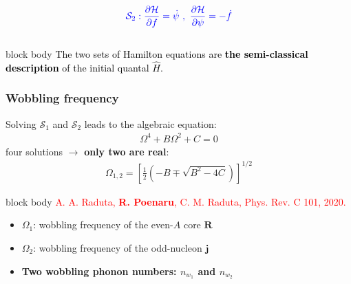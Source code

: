 \documentclass{beamer}
\begin{document}
\begin{frame}
\begin{columns}
\begin{column}{0.4\textwidth}
\begin{align}
				{\color{blue}\mathcal{S}_2: \frac{\partial \mathcal{H}}{\partial f}=\dot{\psi}\ ,\ \frac{\partial \mathcal{H}}{\partial \psi}=-\dot{f}}\nonumber
			\end{align}
		\end{column}
	\end{columns}
	\begin{beamercolorbox}[rounded=true,shadow=false, wd=\linewidth,]{block body}
		\centering
		\textcolor{black}{\small{The two sets of Hamilton equations are \textbf{the semi-classical description} of the initial quantal $\hat{H}$.}}
	\end{beamercolorbox}
\end{frame}


\begin{frame}
	\frametitle{Wobbling frequency}
	Solving {\color{red}$\mathcal{S}_1$} and {\color{blue}$\mathcal{S}_2$} leads to the algebraic equation:
	\begin{align}
		\Omega^4+B\Omega^2+C=0\nonumber
	\end{align}
	four solutions $\longrightarrow$ \textbf{only two are real}:
	\begin{align}
		\Omega_{1,2}=\left[\frac{1}{2}\left(-B\mp\sqrt{B^2-4C}\right)\right]^{1/2}\nonumber
	\end{align}
	\vspace{-0.3cm}
	\begin{beamercolorbox}[rounded=true,shadow=false, wd=\linewidth,]{block body}
		\centering
		\textcolor{red}{\footnotesize{A. A. Raduta, \textbf{R. Poenaru}, C. M. Raduta, Phys. Rev. C 101, 2020.}}
	\end{beamercolorbox}
	\vspace{-0.3cm}
	\begin{itemize}
		\item {\color{red}$\Omega_1$}: wobbling frequency of the {\color{red}even-$A$ core $\mathbf{R}$}
		\item {\color{blue}$\Omega_2$}: wobbling frequency of the {\color{blue}odd-nucleon $\mathbf{j}$}
		\item \textbf{Two wobbling phonon numbers: {\color{red}$n_{w_1}$} and {\color{blue}$n_{w_2}$}}
	\end{itemize}
\end{frame}
\end{document}
